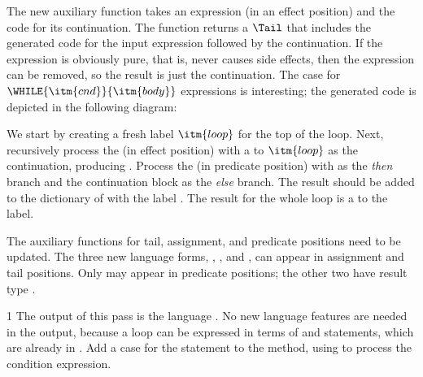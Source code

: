 \documentclass[7x10]{TimesAPriori_MIT}%
\def\pythonEd{1}
\providecommand{\BookEdition}{1}
\let\edition\BookEdition
\newcommand{\pythonColor}[0]{}
\numberwithin{theorem}{chapter}
\numberwithin{definition}{chapter}
\numberwithin{equation}{chapter}
\begin{document}
{The new auxiliary function  takes an
expression (in an effect position) and the code for its
continuation. The function returns a $\Tail$ that includes the
generated code for the input expression followed by the
continuation. If the expression is obviously pure, that is, never
causes side effects, then the expression can be removed, so the result
is just the continuation.
%
The case for $\WHILE{\itm{cnd}}{\itm{body}}$ expressions is
interesting; the generated code is depicted in the following diagram:
\begin{center}
  \begin{minipage}{0.3\textwidth}
\end{minipage}
\end{center}
We start by creating a fresh label $\itm{loop}$ for the top of the
loop.  Next, recursively process the  (in effect position)
with a  to $\itm{loop}$ as the continuation, producing
. Process the  (in predicate position) with
 as the \emph{then} branch and the continuation block as the
\emph{else} branch. The result should be added to the dictionary of
 with the label . The result for the
whole  loop is a  to the  label.

The auxiliary functions for tail, assignment, and predicate positions
need to be updated. The three new language forms, ,
, and , can appear in assignment and tail
positions.  Only  may appear in predicate positions; the
other two have result type .

\fi}
%
{\if\edition\pythonEd\pythonColor
%
The output of this pass is the language \LangCIf{}. No new language
features are needed in the output, because a  loop can be
expressed in terms of  and  statements, which are
already in \LangCIf{}.
%  
Add a case for the  statement to the
 method, using  to process
the condition expression.
%
\fi}
\end{document}
